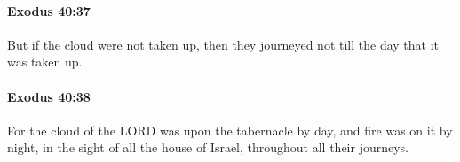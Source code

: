 		\paragraph{Exodus 40:37} %
			\label{EXODUS-40-37}

			But if the cloud were not taken up, then they journeyed not till the day that it was taken up.


		\paragraph{Exodus 40:38} %
			\label{EXODUS-40-38}

			For the cloud of the LORD was upon the tabernacle by day, and fire was on it by night, in the sight of all the house of Israel, throughout all their journeys.


